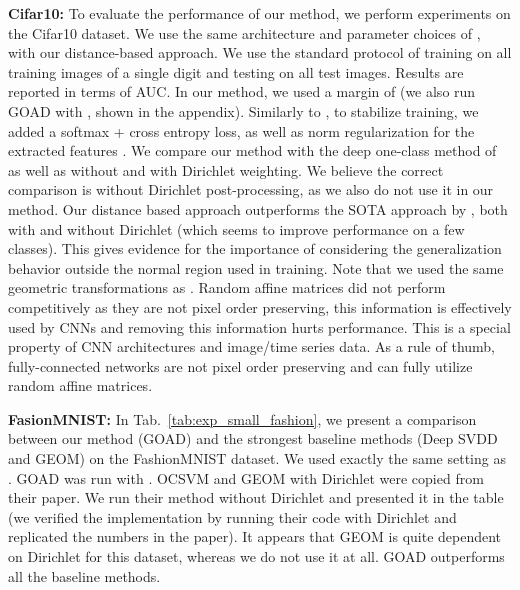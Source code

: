 \documentclass{article} \usepackage{iclr2020_conference,times}
\begin{document}
\textbf{Cifar10:} To evaluate the performance of our method, we perform experiments on the Cifar10 dataset. We use the same architecture and parameter choices of  \cite{golan2018deep}, with our distance-based approach. We use the standard protocol of training on all training images of a single digit and testing on all test images. Results are reported in terms of AUC. In our method, we used a margin of  (we also run GOAD with , shown in the appendix). Similarly to \cite{he2018triplet}, to stabilize training, we added a softmax + cross entropy loss, as well as  norm regularization for the extracted features . We compare our method with the deep one-class method of \cite{ruff2018deep} as well as \cite{golan2018deep} without and with Dirichlet weighting. We believe the correct comparison is without Dirichlet post-processing, as we also do not use it in our method. Our distance based approach outperforms the SOTA approach by \cite{golan2018deep}, both with and without Dirichlet (which seems to improve performance on a few classes). This gives evidence for the importance of considering the generalization behavior outside the normal region used in training. Note that we used the same geometric transformations as \cite{golan2018deep}. Random affine matrices did not perform competitively as they are not pixel order preserving, this information is effectively used by CNNs and removing this information hurts performance. This is a special property of CNN architectures and image/time series data. As a rule of thumb, fully-connected networks are not pixel order preserving and can fully utilize random affine matrices.

\textbf{FasionMNIST:} In Tab.~\ref{tab:exp_small_fashion}, we present a comparison between our method (GOAD) and the strongest baseline methods (Deep SVDD and GEOM) on the FashionMNIST dataset. We used exactly the same setting as \cite{golan2018deep}. GOAD was run with . OCSVM and GEOM with Dirichlet were copied from their paper. We run their method without Dirichlet and presented it in the table (we verified the implementation by running their code with Dirichlet and replicated the numbers in the paper). It appears that GEOM is quite dependent on Dirichlet for this dataset, whereas we do not use it at all. GOAD outperforms all the baseline methods.
\end{document}
